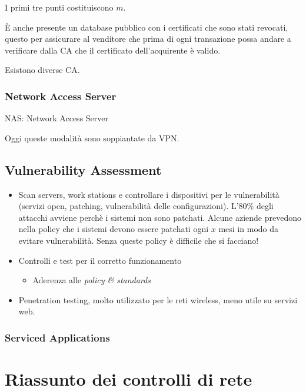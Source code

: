 I primi tre punti costituiscono $m$.

È anche presente un database pubblico con i certificati che sono stati revocati,
questo per assicurare al venditore che prima di ogni transazione possa andare a
verificare dalla CA che il certificato dell'acquirente è valido.

Esistono diverse CA.

\subsubsection{Network Access Server}

NAS: Network Access Server

Oggi queste modalità sono soppiantate da VPN.


\subsection{Vulnerability Assessment}

\begin{itemize}
\item Scan servers, work stations e controllare i dispositivi per le
vulnerabilità (servizi open, patching, vulnerabilità delle configurazioni).
L'80\% degli attacchi avviene perchè i sistemi non sono patchati. Alcune aziende
prevedono nella policy che i sistemi devono essere patchati ogni $x$ mesi in
modo da evitare vulnerabilità. Senza queste policy è difficile che si facciano!
\item Controlli e test per il corretto funzionamento
\begin{itemize}
 \item Aderenza alle \textit{policy \& standards}
\end{itemize}
\item Penetration testing, molto utilizzato per le reti wireless, meno utile su
servizi web.
\end{itemize}

\subsubsection{Serviced Applications}


\section{Riassunto dei controlli di rete}

